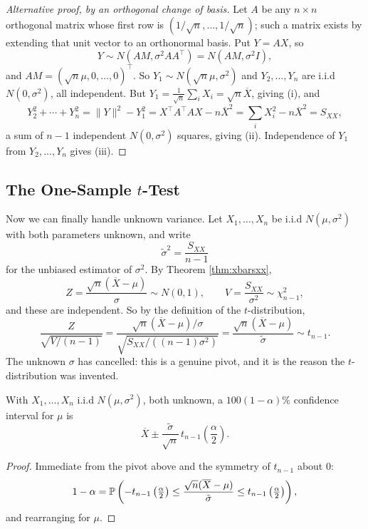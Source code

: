\documentclass[a4paper]{scrartcl}
\begin{document}
\begin{proof}[Alternative proof, by an orthogonal change of basis]
  Let $A$ be any $n\times n$ orthogonal matrix whose first row is $(1/\sqrt n, \dots, 1/\sqrt n)$; such a matrix exists by extending that unit vector to an orthonormal basis. Put $Y = AX$, so
  $$
  Y \sim N\left(A M, \sigma^2 A A^\top\right) = N\left(AM, \sigma^2 I\right),
  $$
  and $AM = (\sqrt n \mu, 0,\dots,0)^\top$. So $Y_1 \sim N(\sqrt n\mu,\sigma^2)$ and $Y_2,\dots,Y_n$ are i.i.d $N(0,\sigma^2)$, all independent. But $Y_1 = \frac{1}{\sqrt n}\sum_i X_i = \sqrt n \overline{X}$, giving (i), and
  $$
  Y_2^2 + \cdots + Y_n^2 = \|Y\|^2 - Y_1^2 = X^\top A^\top A X - n\overline{X}^2 = \sum_i X_i^2 - n\overline{X}^2 = S_{XX},
  $$
  a sum of $n-1$ independent $N(0,\sigma^2)$ squares, giving (ii). Independence of $Y_1$ from $Y_2,\dots,Y_n$ gives (iii).
\end{proof}

\subsection{The One-Sample \texorpdfstring{$t$}{t}-Test}

Now we can finally handle unknown variance. Let $X_1,\dots,X_n$ be i.i.d $N(\mu,\sigma^2)$ with both parameters unknown, and write
$$
\tilde\sigma^2 = \frac{S_{XX}}{n-1}
$$
for the unbiased estimator of $\sigma^2$. By Theorem \ref{thm:xbarsxx},
$$
Z = \frac{\sqrt n\left(\overline{X}-\mu\right)}{\sigma} \sim N(0,1), \qquad V = \frac{S_{XX}}{\sigma^2}\sim\chi^2_{n-1},
$$
and these are independent. So by the definition of the $t$-distribution,
$$
\frac{Z}{\sqrt{V/(n-1)}} = \frac{\sqrt n\left(\overline{X}-\mu\right)/\sigma}{\sqrt{S_{XX}/\left((n-1)\sigma^2\right)}} = \frac{\sqrt{n}\left(\overline{X}-\mu\right)}{\tilde\sigma} \sim t_{n-1}.
$$
The unknown $\sigma$ has cancelled: this is a genuine pivot, and it is the reason the $t$-distribution was invented.

\begin{proposition}
  With $X_1,\dots,X_n$ i.i.d $N(\mu,\sigma^2)$, both unknown, a $100(1-\alpha)\%$ confidence interval for $\mu$ is
  $$
  \overline{X} \pm \frac{\tilde\sigma}{\sqrt n}\, t_{n-1}\!\left(\frac{\alpha}{2}\right).
  $$
\end{proposition}
\begin{proof}
  Immediate from the pivot above and the symmetry of $t_{n-1}$ about $0$:
  $$
  1 - \alpha = \mathbb{P}\left(-t_{n-1}\left(\tfrac{\alpha}{2}\right)\leq \frac{\sqrt n(\overline{X}-\mu)}{\tilde\sigma}\leq t_{n-1}\left(\tfrac{\alpha}{2}\right)\right),
  $$
  and rearranging for $\mu$.
\end{proof}
\end{document}
